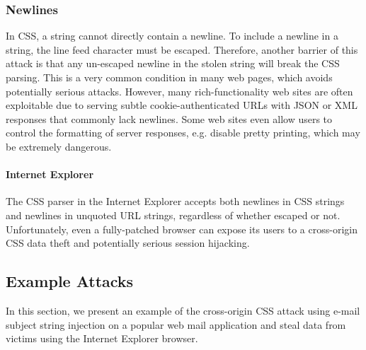 \documentclass{acm_proc_article-sp}
\begin{document}
\subsubsection{Newlines}
In CSS, a string cannot directly contain a newline. To include a newline in a string, the line feed character must be escaped. Therefore, another barrier of this attack is that any un-escaped newline in the stolen string will break the CSS parsing. This is a very common condition in many web pages, which avoids potentially serious attacks. However, many rich-functionality web sites are often exploitable due to serving subtle cookie-authenticated URLs with JSON or XML responses that commonly lack newlines. Some web sites even allow users to control the formatting of server responses, e.g. disable pretty printing, which may be extremely dangerous.
\paragraph{Internet Explorer}
The CSS parser in the Internet Explorer accepts both newlines in CSS strings and newlines in unquoted URL strings, regardless of whether escaped or not. Unfortunately, even a fully-patched browser can expose its users to a cross-origin CSS data theft and potentially serious session hijacking.

\subsection{Example Attacks}
In this section, we present an example of the cross-origin CSS attack using e-mail subject string injection on a popular web mail application and steal data from victims using the Internet Explorer browser.
\end{document}
